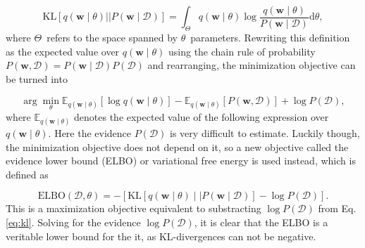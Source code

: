 	\begin{equation}
	\label{eq:kl_open}
	\mathrm{KL}\left[q(\pmb{w} \mid \theta) ||P(\pmb{w} \mid \mathcal{D})\right] = \int_{\Theta} q(\pmb{w} \mid \theta) \log \frac{q(\pmb{w} \mid \theta)}{P(\pmb{w} \mid \mathcal{D})} \mathrm{d}\theta, 
	\end{equation}
	where $\Theta$ refers to the space spanned by $\theta$ parameters. Rewriting this definition as the expected value over $q(\pmb{w} \mid \theta)$ using the chain rule of probability $P(\pmb{w},\mathcal{D}) = P(\pmb{w} \mid \mathcal{D}) P(\mathcal{D})$ and rearranging, the minimization objective can be turned into 
	
	\begin{equation}
	\label{eq:elbo_step1}
		\arg \min_{\theta}
		\mathbb{E}_{q(\pmb{w} \mid \theta)}[\log q(\pmb{w} \mid \theta)] -
		\mathbb{E}_{q(\pmb{w} \mid \theta)}[P(\pmb{w},\mathcal{D})] + 
		\log P(\mathcal{D}),
	\end{equation} 
	where $\mathbb{E}_{q(\pmb{w} \mid \theta)}$ denotes the expected value of the following expression over $q(\pmb{w} \mid \theta)$. 
	 Here the evidence $P(\mathcal{D})$ is very difficult to estimate. Luckily though, the minimization objective does not depend on it, so a new objective called the evidence lower bound (ELBO) or variational free energy is used instead, which is defined as 
	 
	 \begin{equation}
	 \label{eq:elbo_step2}
	 	\text{ELBO}(\mathcal{D}, \theta) = - \left[\mathrm{KL}\left[q(\pmb{w}\mid\theta) \mid \mid P(\pmb{w} \mid \mathcal{D})\right] - \log P(\mathcal{D})\right].
	 \end{equation}
	 This is a maximization objective equivalent to substracting $\log P(\mathcal{D})$ from Eq. \eqref{eq:kl}. Solving for the evidence $\log P(\mathcal{D})$, it is clear that the ELBO is a veritable lower bound for the it, as KL-divergences can not be negative.  

